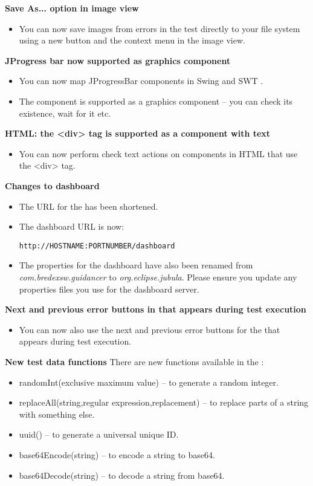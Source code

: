 \textbf{Save As... option in image view}
\begin{itemize}
\item You can now save images from errors in the test directly to your file system  using a new button and the context menu in the image view.
\end{itemize}

\textbf{JProgress bar now supported as graphics component}
\begin{itemize}
\item You can now map JProgressBar components in Swing and SWT \gdauts{}.
\item The component is supported as a graphics component -- you can check its existence, wait for it etc.
\end{itemize}

\textbf{HTML: the <div> tag is supported as a component with text}
\begin{itemize}
\item You can now perform check text actions on components in HTML \gdauts{} that use the <div> tag.
\end{itemize}

\textbf{Changes to dashboard}
\begin{itemize}
\item The URL for the \dash{} has been shortened. 
\item The dashboard URL is now:
\begin{verbatim}
http://HOSTNAME:PORTNUMBER/dashboard
\end{verbatim}
\item The properties for the dashboard have also been renamed from \textit{com.bredexsw.guidancer} to \textit{org.eclipse.jubula}. Please ensure you update any properties files you use for the dashboard server.
\end{itemize}

\textbf{Next and previous error buttons in \gdtestresultview{} that appears during test execution}
\begin{itemize}
\item You can now also use the next and previous error buttons for the \gdtestresultview{} that appears during test execution.
\end{itemize}

\textbf{New test data functions}
There are new functions available in the \ite{}:
\begin{itemize}
\item randomInt(exclusive maximum value) -- to generate a random integer.
\item replaceAll(string,regular expression,replacement) -- to replace parts of a string with something else.
\item uuid() -- to generate a universal unique ID.
\item base64Encode(string) -- to encode a string to base64.
\item base64Decode(string) -- to decode a string from base64.
\end{itemize}
